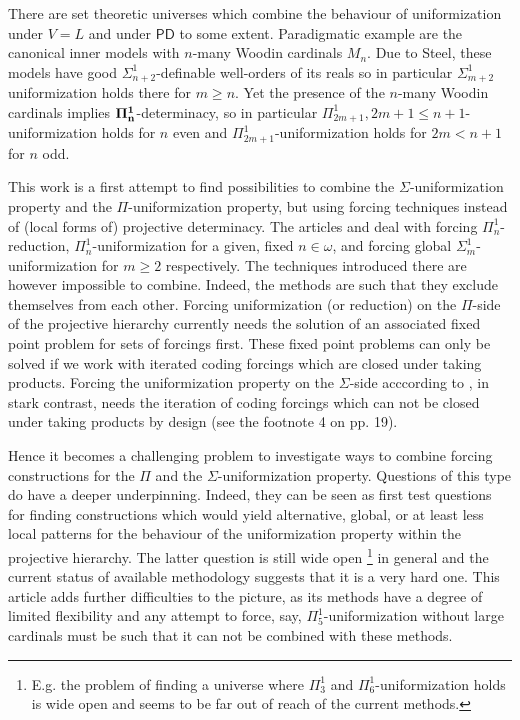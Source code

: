 \documentclass[a4paper,11pt]{article}
\newcommand{\PD}{\mathsf{PD}}
\begin{document}
There are set theoretic universes which combine the behaviour of uniformization under $V=L$ and under $\PD$ to some extent. Paradigmatic example are the canonical inner models with $n$-many Woodin cardinals $M_n$. Due to Steel, these models have good $\Sigma^1_{n+2}$-definable well-orders of its reals so in particular $\Sigma^1_{m+2}$ uniformization holds there for $m \ge n$. Yet the presence of the $n$-many Woodin cardinals implies $\bf{\Pi}^1_n$-determinacy, so in particular $\Pi^1_{2m+1}, 2m+1 \le n+1$-uniformization holds for $n$ even and $\Pi^1_{2m+1}$-uniformization holds for $2m < n+1$ for $n$ odd. 


 
This work is a first attempt to find possibilities to combine the $\Sigma$-uniformization property and the $\Pi$-uniformization property, but using forcing techniques instead of (local forms of) projective determinacy. The articles \cite{Reduction} \cite{Uniformization} and \cite{BPFA and uniformization} deal with forcing $\Pi^1_n$-reduction, $\Pi^1_n$-uniformization for a given, fixed $n \in \omega$, and forcing global $\Sigma^1_m$-uniformization for $m \ge 2$ respectively. 
The techniques introduced there are however impossible to combine. Indeed, the methods are such that they exclude themselves from each other. Forcing uniformization (or reduction) on the $\Pi$-side of the projective hierarchy currently needs the solution of an associated fixed point problem for sets of forcings first. These fixed point problems can only be solved if we work with iterated coding forcings which are closed under taking products.
Forcing the uniformization property on the $\Sigma$-side acccording to \cite{BPFA and uniformization}, in stark contrast, needs the iteration of coding forcings which can not be closed under taking products by design (see the footnote 4 on pp. 19). 


Hence it becomes a challenging problem to investigate ways to combine forcing constructions for the $\Pi$ and the $\Sigma$-uniformization property. 
Questions of this type do have a deeper underpinning. Indeed, they can be seen as first test questions for finding constructions which would yield alternative, global, or at least less local patterns for the behaviour of the uniformization property within the projective hierarchy. The latter question is still wide open \footnote{E.g. the problem of finding a universe where $\Pi^1_3$ and $\Pi^1_6$-uniformization holds is wide open and seems to be far out of reach of the current methods.} in general and the current status of available methodology suggests that it is a very hard one. This article adds further difficulties to the picture, as its methods have a degree of limited flexibility and any attempt to force, say, $\Pi^1_5$-uniformization without large cardinals must be such that it can not be combined with these methods.
\end{document}
